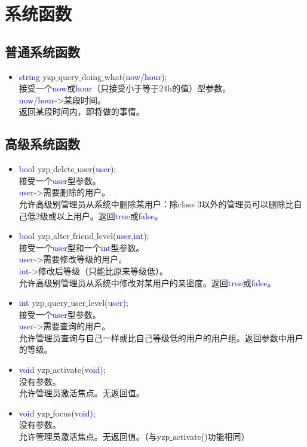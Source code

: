 \documentclass[UTF8]{ctexart}
\begin{document}
\section{系统函数}
\subsection{普通系统函数}
\begin{itemize}
\item \textcolor{blue}{string} yzp\underline{ }query\underline{ }doing\underline{ }what(\textcolor{blue}{now}/\textcolor{blue}{hour});\\
接受一个\textcolor{blue}{now}或\textcolor{blue}{hour}（只接受小于等于24h的值）型参数。\\
\textcolor{blue}{now}/\textcolor{blue}{hour}->某段时间。\\
返回某段时间内，即将做的事情。
\end{itemize}
\subsection{高级系统函数}
\begin{itemize}
\item \textcolor{blue}{bool} yzp\underline{ }delete\underline{ }user(\textcolor{blue}{user});\\
接受一个\textcolor{blue}{user}型参数。\\
\textcolor{blue}{user}->需要删除的用户。\\
允许高级别管理员从系统中删除某用户：除\textcolor[rgb]{0.9,0.6,0}{class 3}以外的管理员可以删除比自己低2级或以上用户。返回\textcolor{blue}{true}或\textcolor{blue}{false}。
\item \textcolor{blue}{bool} yzp\underline{ }alter\underline{ }friend\underline{ }level(\textcolor{blue}{user},\textcolor{blue}{int});\\
接受一个\textcolor{blue}{user}型和一个\textcolor{blue}{int}型参数。\\
\textcolor{blue}{user}->需要修改等级的用户。\\
\textcolor{blue}{int}->修改后等级（只能比原来等级低）。\\
允许高级别管理员从系统中修改对某用户的亲密度。返回\textcolor{blue}{true}或\textcolor{blue}{false}。
\item \textcolor{blue}{int} yzp\underline{ }query\underline{ }user\underline{ }level(\textcolor{blue}{user});\\
接受一个\textcolor{blue}{user}型参数。\\
\textcolor{blue}{user}->需要查询的用户。\\
允许管理员查询与自己一样或比自己等级低的用户的用户组。返回参数中用户的等级。
\item \textcolor{blue}{void} yzp\underline{ }activate(\textcolor{blue}{void});\\
没有参数。\\
允许管理员激活焦点。无返回值。
\item \textcolor{blue}{void} yzp\underline{ }focus(\textcolor{blue}{void});\\
没有参数。\\
允许管理员激活焦点。无返回值。（与yzp\underline{ }activate()功能相同）
\end{itemize}
\end{document}
